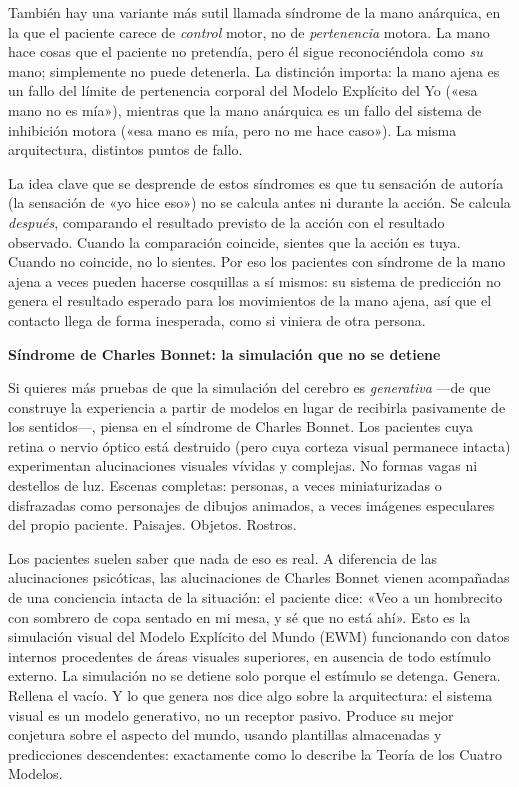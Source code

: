 \documentclass[11pt, twoside, openright]{book}
\begin{document}
También hay una variante más sutil llamada síndrome de la mano anárquica, en la que el paciente carece de \textit{control} motor, no de \textit{pertenencia} motora. La mano hace cosas que el paciente no pretendía, pero él sigue reconociéndola como \textit{su} mano; simplemente no puede detenerla. La distinción importa: la mano ajena es un fallo del límite de pertenencia corporal del Modelo Explícito del Yo («esa mano no es mía»), mientras que la mano anárquica es un fallo del sistema de inhibición motora («esa mano es mía, pero no me hace caso»). La misma arquitectura, distintos puntos de fallo.

La idea clave que se desprende de estos síndromes es que tu sensación de autoría (la sensación de «yo hice eso») no se calcula antes ni durante la acción. Se calcula \textit{después}, comparando el resultado previsto de la acción con el resultado observado. Cuando la comparación coincide, sientes que la acción es tuya. Cuando no coincide, no lo sientes. Por eso los pacientes con síndrome de la mano ajena a veces pueden hacerse cosquillas a sí mismos: su sistema de predicción no genera el resultado esperado para los movimientos de la mano ajena, así que el contacto llega de forma inesperada, como si viniera de otra persona.

\textbf{Síndrome de Charles Bonnet: la simulación que no se detiene}

Si quieres más pruebas de que la simulación del cerebro es \textit{generativa} ---de que construye la experiencia a partir de modelos en lugar de recibirla pasivamente de los sentidos---, piensa en el síndrome de Charles Bonnet. Los pacientes cuya retina o nervio óptico está destruido (pero cuya corteza visual permanece intacta) experimentan alucinaciones visuales vívidas y complejas. No formas vagas ni destellos de luz. Escenas completas: personas, a veces miniaturizadas o disfrazadas como personajes de dibujos animados, a veces imágenes especulares del propio paciente. Paisajes. Objetos. Rostros.

Los pacientes suelen saber que nada de eso es real. A diferencia de las alucinaciones psicóticas, las alucinaciones de Charles Bonnet vienen acompañadas de una conciencia intacta de la situación: el paciente dice: «Veo a un hombrecito con sombrero de copa sentado en mi mesa, y sé que no está ahí». Esto es la simulación visual del Modelo Explícito del Mundo (EWM) funcionando con datos internos procedentes de áreas visuales superiores, en ausencia de todo estímulo externo. La simulación no se detiene solo porque el estímulo se detenga. Genera. Rellena el vacío. Y lo que genera nos dice algo sobre la arquitectura: el sistema visual es un modelo generativo, no un receptor pasivo. Produce su mejor conjetura sobre el aspecto del mundo, usando plantillas almacenadas y predicciones descendentes: exactamente como lo describe la Teoría de los Cuatro Modelos.
\end{document}
